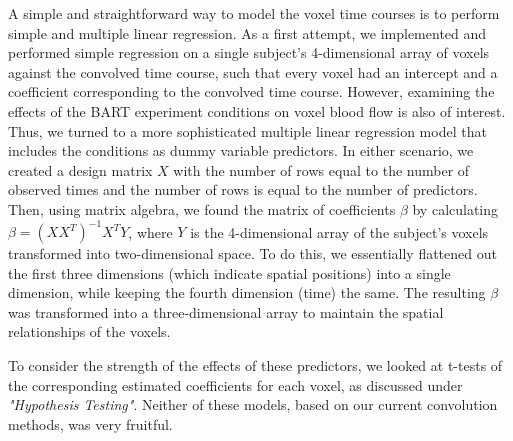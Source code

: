 \par \indent A simple and straightforward way to model the voxel time courses is to perform simple and multiple linear regression. As a first attempt, we implemented and performed simple regression on a single subject's 4-dimensional array of voxels against the convolved time course, such that every voxel had an intercept and a coefficient corresponding to the convolved time course. However, examining the effects of the BART experiment conditions on voxel blood flow is also of interest. Thus, we turned to a more sophisticated multiple linear regression model that includes the conditions as dummy variable predictors. In either scenario, we created a design matrix $X$ with the number of rows equal to the number of observed times and the number of rows is equal to the number of predictors. Then, using matrix algebra, we found the matrix of coefficients $\beta$ by calculating $\beta = (X X^T)^{-1} X^T Y$, where $Y$ is the 4-dimensional array of the subject's voxels transformed into two-dimensional space. To do this, we essentially flattened out the first three dimensions (which indicate spatial positions) into a single dimension, while keeping the fourth dimension (time) the same. The resulting $\beta$ was transformed into a three-dimensional array to maintain the spatial relationships of the voxels. 

\par To consider the strength of the effects of these predictors, we looked at t-tests of the corresponding estimated coefficients for each voxel, as discussed under \textit{"Hypothesis Testing"}. Neither of these models, based on our current convolution methods, was very fruitful. 

